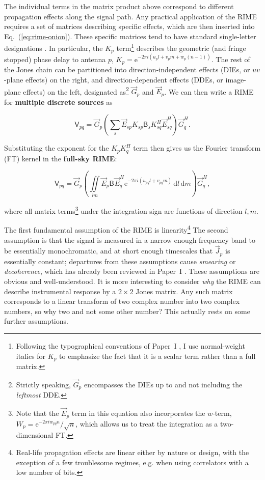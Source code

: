 \documentclass[]{aa}
\newcommand{\herm}{H}
\newcommand{\jones}[2]{\vec {#1}_{#2}}
\newcommand{\jonesT}[2]{\vec {#1}^{\herm}_{#2}}
\newcommand{\coh}[2]{\mathsf{{#1}}_{{#2}}}
\newcommand{\Exp}[1]{\mathrm{e}^{#1}}
\newcommand{\DD}[1]{\,\mathrm{d}{#1}}
\newcommand{\EDIT}[1]{#1}
\begin{document}
The individual terms in the matrix product above correspond to different propagation effects along the signal path. Any practical application of the RIME 
requires a set of matrices describing specific effects, which are then inserted into Eq.~(\ref{eq:rime-onion}). These specific matrices tend to have standard single-letter designations \citep[see e.g.][Sect.~7.3]{meqtrees}. In particular, the $K_p$ term\footnote{Following the typographical conventions of Paper~I \citep[][Sect.~1.4]{RRIME1}, I use normal-weight italics for $K_p$ to emphasize the fact that it is a scalar term rather than a full matrix.} describes the geometric (and fringe stopped) phase delay to antenna $p$,  $K_p = \Exp{-2\pi i(u_p l+v_p m+w_p (n-1))}.$ The rest of the Jones chain can be partitioned into direction-independent effects (DIEs, or $uv$-plane effects) on the right, and direction-dependent effects (DDEs, or image-plane effects) on the left, designated as\footnote{Strictly speaking, $\jones{G}{p}$ encompasses the DIEs up to and not including the \emph{leftmost} DDE.} $\jones{G}{p}$ and $\jones{E}{p}$. We can then write a RIME for {\bf multiple discrete sources} as

\begin{equation}
  \label{eq:rime-nps}
  \coh{V}{pq} = \jones{G}{p} \left ( \sum_{s}{\jones{E}{sp} K_{sp} \coh{B}{s} K^\herm_{sq} \jonesT{E}{sq}} \right ) \jonesT{G}{q}.
\end{equation}

Substituting the exponent for the $K_pK_q^\herm$ term then gives us the Fourier transform (FT) kernel in the {\bf full-sky RIME}:

\begin{equation}
  \label{eq:rime-fullsky}
  \coh{V}{pq} = \jones{G}{p} \left( \iint\limits_{lm} \jones{E}{p} \coh{B}{} \jonesT{E}{q} \Exp{-2\pi i(u_{pq} l+v_{pq} m)} \DD{l}\DD{m} \right ) \jonesT{G}{q},
\end{equation}

where all matrix terms\footnote{Note that the $\jones{E}{p}$ term in this equation also incorporates the $w$-term, $W_p=\Exp{-2\pi iw_{pq}n}/\sqrt{n}$,
which allows us to treat the integration as a two-dimensional FT.} under the integration sign are functions of direction $l,m$.

The first fundamental assumption of the RIME is linearity\EDIT{\footnote{Real-life propagation effects are linear either by nature or design, with the exception of a few troublesome regimes, e.g. when using correlators with a low number of bits.}} The second assumption is that the signal is measured in a narrow enough frequency band to be essentially monochromatic, and at short enough timescales that $\jones{J}{p}$ is essentially constant; departures from these assumptions cause \emph{smearing} or \emph{decoherence}, which has already been reviewed in Paper~I \citep[][Sect.~5.2]{RRIME1}. These assumptions are obvious and well-understood. It is more interesting to consider \emph{why\/} the RIME can describe instrumental response by a $2\times2$ Jones matrix. Any such matrix corresponds to a linear transform of two complex number into two complex numbers, so why two and not some other number? This actually rests on some further assumptions.
\end{document}
